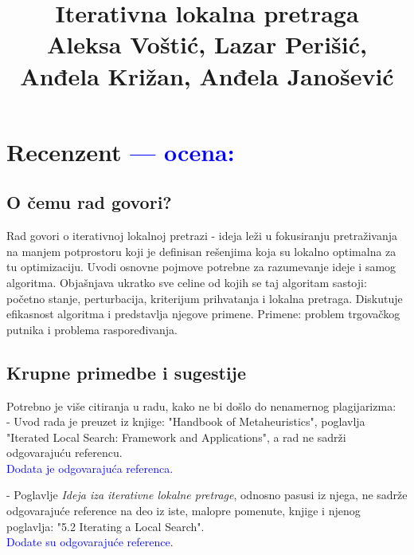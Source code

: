 \documentclass[a4paper]{report}
\newcommand{\odgovor}[1]{\textcolor{blue}{#1}}
\begin{document}
\title{Iterativna lokalna pretraga\\ \small{Aleksa Voštić, Lazar Perišić, Anđela Križan, Anđela Janošević}}

\maketitle

\tableofcontents

\chapter{Recenzent \odgovor{--- ocena:} }


\section{O čemu rad govori?}
Rad govori o iterativnoj lokalnoj pretrazi -  ideja leži u fokusiranju pretraživanja na manjem potprostoru koji je definisan rešenjima koja su lokalno optimalna za tu optimizaciju. Uvodi osnovne pojmove potrebne za razumevanje ideje i samog algoritma. Objašnjava ukratko sve celine od kojih se taj algoritam sastoji: početno stanje, perturbacija, kriterijum prihvatanja i lokalna pretraga. Diskutuje efikasnost algoritma i predstavlja njegove primene. Primene: problem trgovačkog putnika i problema raspoređivanja.

\section{Krupne primedbe i sugestije}
Potrebno je više citiranja u radu, kako ne bi došlo do nenamernog plagijarizma: \\

- Uvod rada je preuzet iz knjige: "Handbook of Metaheuristics", poglavlja "Iterated Local Search: Framework and Applications", a rad ne sadrži odgovarajuću referencu.\\
\odgovor{Dodata je odgovarajuća referenca.\\}

- Poglavlje {\em Ideja iza iterativne lokalne pretrage}, odnosno pasusi iz njega, ne sadrže odgovarajuće reference na deo iz iste, malopre pomenute, knjige i njenog poglavlja: "5.2 Iterating a Local Search".\\
\odgovor{Dodate su odgovarajuće reference.\\}
\end{document}
